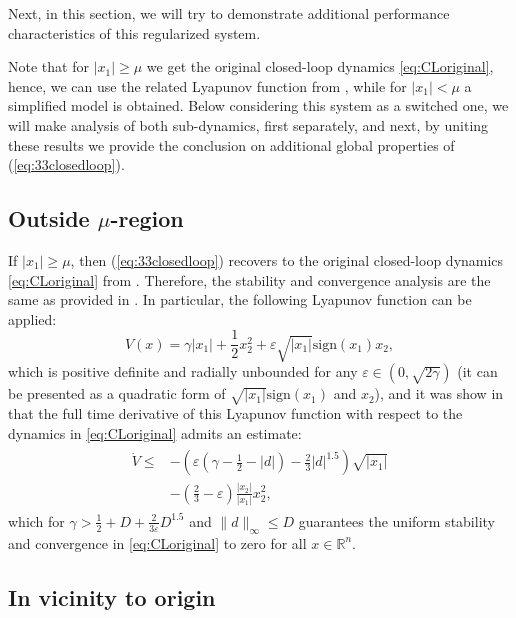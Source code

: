 \documentclass[letterpaper, 10 pt, conference]{ieeeconf}  %
\begin{document}
Next, in this section, we will try to demonstrate additional performance
characteristics of this regularized system.

Note that for $|x_{1}|\geq\mu$ we get the original closed-loop dynamics
\eqref{eq:CLoriginal}, hence, we can use the related Lyapunov function
from \cite{ruderman2024robust}, while for $|x_{1}|<\mu$ a simplified
model is obtained. Below considering this system as a switched one,
we will make analysis of both sub-dynamics, first separately, and
next, by uniting these results we provide the conclusion on additional
global properties of (\ref{eq:33closedloop}).

\subsection{Outside $\mu$-region}

\label{sec:33:sub:1}

If $|x_{1}|\geq\mu$, then (\ref{eq:33closedloop}) recovers to the
original closed-loop dynamics \eqref{eq:CLoriginal} from \cite{ruderman2024robust}.
Therefore, the stability and convergence analysis are the same as
provided in \cite{ruderman2024robust}. In particular, the following
Lyapunov function can be applied:
\begin{equation}
V(x)=\gamma|x_{1}|+\frac{1}{2}x_{2}^{2}+\varepsilon\sqrt{|x_{1}|}\text{sign}(x_{1})x_{2},\label{eq:Lyapunov0}
\end{equation}
which is positive definite and radially unbounded for any $\varepsilon\in(0,\sqrt{2\gamma})$
(it can be presented as a quadratic form of $\sqrt{|x_{1}|}\text{sign}(x_{1})$
and $x_{2}$), and it was show in \cite{ruderman2024robust} that
the full time derivative of this Lyapunov function with respect to
the dynamics in \eqref{eq:CLoriginal} admits an estimate:
\begin{gather*}
\begin{align}
\dot{V}\leq & -\left(\varepsilon\left(\gamma-\frac{1}{2}-|d|\right)-\frac{2}{3}|d|^{1.5}\right)\sqrt{|x_{1}|}\\
& -\left(\frac{2}{3}-\varepsilon\right)\frac{|x_{2}|}{|x_{1}|}x_{2}^{2},
\end{align}
\end{gather*}
which for $\gamma>\frac{1}{2}+D+\frac{2}{3\varepsilon}D^{1.5}$ and
$\|d\|_{\infty}\leq D$ guarantees the uniform stability and convergence
in \eqref{eq:CLoriginal} to zero for all $x\in\mathbb{R}^n$.


\subsection{In vicinity to origin}
\end{document}
